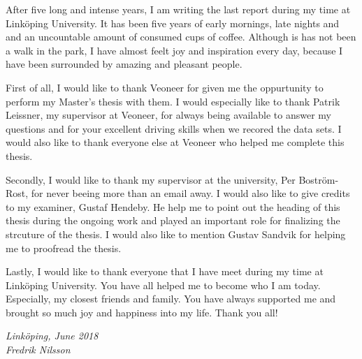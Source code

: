 \begin{acknowledgments}
After five long and intense years, I am writing the last report during my time at Link\"oping University.
It has been five years of early mornings, late nights and and an uncountable amount of consumed cups of coffee.
Although is has not been a walk in the park, I have almost feelt joy and inspiration every day, because I have been surrounded by amazing and pleasant people.

First of all, I would like to thank Veoneer for given me the oppurtunity to perform my Master's thesis with them.
I would especially like to thank Patrik Leissner, my supervisor at Veoneer, for always being available to answer my questions and for your excellent driving skills when we recored the data sets.
I would also like to thank everyone else at Veoneer who helped me complete this thesis.

Secondly, I would like to thank my supervisor at the university, Per Bostr\"om-Rost, for never beeing more than an email away.
I would also like to give credits to my examiner, Gustaf Hendeby.
He help me to point out the heading of this thesis during the ongoing work and played an important role for finalizing the strcuture of the thesis.
I would also like to mention Gustav Sandvik for helping me to proofread the thesis.

Lastly, I would like to thank everyone that I have meet during my time at Link\"oping University.
You have all helped me to become who I am today.
Especially, my closest friends and family.
You have always supported me and brought so much joy and happiness into my life.
Thank you all!

  \addvspace{1em}
  \begin{flushright}
    \textit{%
      Linköping, June 2018\\
      Fredrik Nilsson%
    }
  \end{flushright}
\end{acknowledgments}
